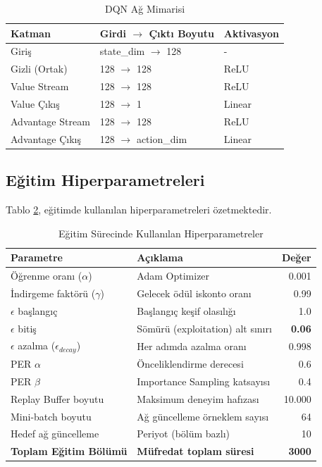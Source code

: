 \documentclass[conference]{IEEEtran}
\begin{document}
\begin{table}[H]
\centering
\caption{DQN Ağ Mimarisi}
\begin{tabular}{lll}
\toprule
\textbf{Katman} & \textbf{Girdi $\rightarrow$ Çıktı Boyutu} & \textbf{Aktivasyon} \\
\midrule
Giriş & state\_dim $\rightarrow$ 128 & - \\
Gizli (Ortak) & 128 $\rightarrow$ 128 & ReLU \\
Value Stream & 128 $\rightarrow$ 128 & ReLU \\
Value Çıkış & 128 $\rightarrow$ 1 & Linear \\
Advantage Stream & 128 $\rightarrow$ 128 & ReLU \\
Advantage Çıkış & 128 $\rightarrow$ action\_dim & Linear \\
\bottomrule
\end{tabular}
\label{tab:network}
\end{table}

\subsection{Eğitim Hiperparametreleri}
Tablo \ref{tab:hyperparams}, eğitimde kullanılan hiperparametreleri özetmektedir.

\begin{table}[H]
\centering
\caption{Eğitim Sürecinde Kullanılan Hiperparametreler}
\begin{tabular}{llr}
\toprule
\textbf{Parametre} & \textbf{Açıklama} & \textbf{Değer} \\
\midrule
Öğrenme oranı ($\alpha$) & Adam Optimizer & 0.001 \\
İndirgeme faktörü ($\gamma$) & Gelecek ödül iskonto oranı & 0.99 \\
$\epsilon$ başlangıç & Başlangıç keşif olasılığı & 1.0 \\
$\epsilon$ bitiş & Sömürü (exploitation) alt sınırı & \textbf{0.06} \\
$\epsilon$ azalma ($\epsilon_{decay}$) & Her adımda azalma oranı & 0.998 \\
PER $\alpha$ & Önceliklendirme derecesi & 0.6 \\
PER $\beta$ & Importance Sampling katsayısı & 0.4 \\
Replay Buffer boyutu & Maksimum deneyim hafızası & 10.000 \\
Mini-batch boyutu & Ağ güncelleme örneklem sayısı & 64 \\
Hedef ağ güncelleme & Periyot (bölüm bazlı) & 10 \\
\textbf{Toplam Eğitim Bölümü} & \textbf{Müfredat toplam süresi} & \textbf{3000} \\
\bottomrule
\end{tabular}
\label{tab:hyperparams}
\end{table}
\end{document}
